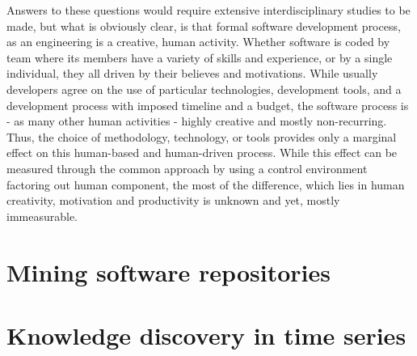Answers to these questions would require extensive interdisciplinary studies to be made, 
but what is obviously clear, is that formal software development process, as an engineering 
is a creative, human activity. 
Whether software is coded 
by team where its members have a variety of skills and experience, or by a single individual,
they all driven by their believes and motivations. While usually developers agree on the use of 
particular technologies, development tools, and a development process with imposed timeline and 
a budget, the software process is - as many other human activities - highly creative and mostly 
non-recurring. Thus, the choice of methodology, technology, or tools provides only a marginal 
effect on this human-based and human-driven process. While this effect can be measured through 
the common approach by using a control environment factoring out human component, the most of 
the difference, which lies in human creativity, motivation and productivity is unknown and yet, 
mostly immeasurable.

\section{Mining software repositories}

\section{Knowledge discovery in time series}
